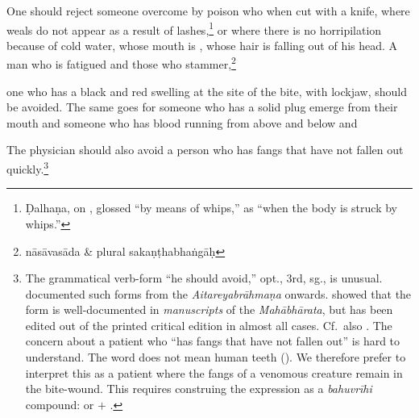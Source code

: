 \begin{translation}[resume]
 \item [3.40cd--3.41]  
 
One should reject someone overcome by poison who  
when cut with a knife, where weals do not appear as a result of  
 lashes,\footnote{Ḍalhaṇa, on , glossed  
“by means of whips,” as “when the body is struck by whips.”} or where 
there is no horripilation because of cold water, whose mouth is 
, whose hair is falling out of his head.  A man who is 
fatigued and those who stammer,\footnote{nāsāvasāda \& plural 
sakaṇṭhabhaṅgāḥ}  
 
 \item[3.42]  
 
one who has a black and red swelling at the site of the bite, with
lockjaw, should be avoided.  The same goes for someone who has a solid
plug emerge from their mouth  and someone who has blood running from
above and below and
 
 \item[3.43ab]  
 
The physician should also avoid a person who has fangs that have not
fallen out quickly.\footnote{The grammatical verb-form
     “he  should avoid,” opt., 3rd, sg., is unusual.
    \citet[10\,ff]{reno-1940}  documented such forms from the
    \emph{Aitareyabrāhmaṇa} onwards.  \citet[\P  6.3.3 “Peculiar optative
    endings”, pp.\,176--177]{ober-2003} showed that the form is
    well-documented in \emph{manuscripts} of the \emph{Mahābhārata}, but
    has been edited out of the printed critical edition in almost all
    cases. Cf.\ also \cite{kuli-2006}.  The concern about a patient who
    “has fangs that have not fallen out” is hard  to understand.  The word
     does not mean human teeth  ().  We therefore
    prefer to interpret this as a patient where the  fangs of a venomous
    creature remain in the bite-wound.  This requires  construing the
    expression as a \emph{bahuvrīhi} compound:  or
     $+$  .}
\end{translation}
